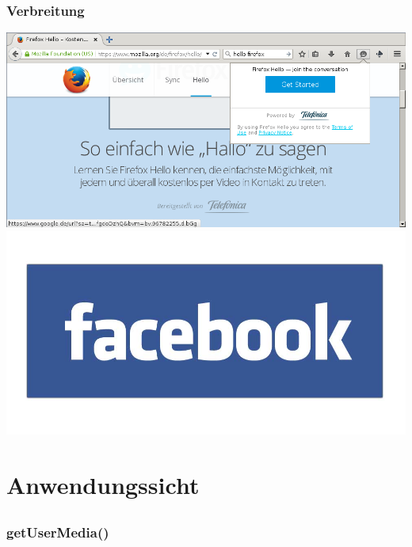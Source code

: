 \documentclass[12pt]{beamer}
\begin{document}
\begin{frame}
  \frametitle{Verbreitung}
  \begin{center}
    \pause
    \includegraphics[height=0.4\textheight]{img/hello_firefox.png} \\
    \pause
    \includegraphics[height=0.3\textheight]{img/facebook.jpg}
  \end{center}
\end{frame}


\section{Anwendungssicht}
\subsection{} 

\begin{frame}
  \frametitle{getUserMedia()}
  \pause
  
\end{frame}
\end{document}
